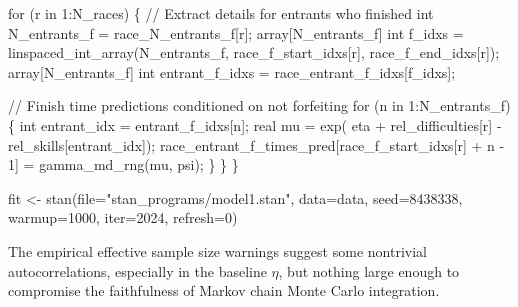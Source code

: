 \documentclass[
  letterpaper,
  DIV=11,
  numbers=noendperiod]{scrartcl}
\newenvironment{Shaded}{\begin{snugshade}}{\end{snugshade}}
\newcommand{\AttributeTok}[1]{\textcolor[rgb]{0.40,0.45,0.13}{#1}}
\newcommand{\CommentTok}[1]{\textcolor[rgb]{0.37,0.37,0.37}{#1}}
\newcommand{\ControlFlowTok}[1]{\textcolor[rgb]{0.00,0.23,0.31}{#1}}
\newcommand{\DataTypeTok}[1]{\textcolor[rgb]{0.68,0.00,0.00}{#1}}
\newcommand{\DecValTok}[1]{\textcolor[rgb]{0.68,0.00,0.00}{#1}}
\newcommand{\FunctionTok}[1]{\textcolor[rgb]{0.28,0.35,0.67}{#1}}
\newcommand{\NormalTok}[1]{\textcolor[rgb]{0.00,0.23,0.31}{#1}}
\newcommand{\OtherTok}[1]{\textcolor[rgb]{0.00,0.23,0.31}{#1}}
\newcommand{\SpecialCharTok}[1]{\textcolor[rgb]{0.37,0.37,0.37}{#1}}
\newcommand{\StringTok}[1]{\textcolor[rgb]{0.13,0.47,0.30}{#1}}
\begin{document}
\begin{codelisting}
\begin{Shaded}
\begin{Highlighting}[]
  \ControlFlowTok{for}\NormalTok{ (r }\ControlFlowTok{in} \DecValTok{1}\NormalTok{:N\_races) \{}
    \CommentTok{// Extract details for entrants who finished}
    \DataTypeTok{int}\NormalTok{ N\_entrants\_f = race\_N\_entrants\_f[r];}
    \DataTypeTok{array}\NormalTok{[N\_entrants\_f] }\DataTypeTok{int}\NormalTok{ f\_idxs}
\NormalTok{      = linspaced\_int\_array(N\_entrants\_f,}
\NormalTok{                            race\_f\_start\_idxs[r],}
\NormalTok{                            race\_f\_end\_idxs[r]);}
    \DataTypeTok{array}\NormalTok{[N\_entrants\_f] }\DataTypeTok{int}\NormalTok{ entrant\_f\_idxs}
\NormalTok{      = race\_entrant\_f\_idxs[f\_idxs];}

    \CommentTok{// Finish time predictions conditioned on not forfeiting}
    \ControlFlowTok{for}\NormalTok{ (n }\ControlFlowTok{in} \DecValTok{1}\NormalTok{:N\_entrants\_f) \{}
      \DataTypeTok{int}\NormalTok{ entrant\_idx = entrant\_f\_idxs[n];}
      \DataTypeTok{real}\NormalTok{ mu = exp(  eta}
\NormalTok{                    + rel\_difficulties[r]}
\NormalTok{                    {-} rel\_skills[entrant\_idx]);}
\NormalTok{      race\_entrant\_f\_times\_pred[race\_f\_start\_idxs[r] + n {-} }\DecValTok{1}\NormalTok{]}
\NormalTok{        = gamma\_md\_rng(mu, psi);}
\NormalTok{    \}}
\NormalTok{  \}}
\NormalTok{\}}
\end{Highlighting}
\end{Shaded}

\end{codelisting}

\begin{Shaded}
\begin{Highlighting}[]
\NormalTok{fit }\OtherTok{\textless{}{-}} \FunctionTok{stan}\NormalTok{(}\AttributeTok{file=}\StringTok{"stan\_programs/model1.stan"}\NormalTok{,}
            \AttributeTok{data=}\NormalTok{data, }\AttributeTok{seed=}\DecValTok{8438338}\NormalTok{,}
            \AttributeTok{warmup=}\DecValTok{1000}\NormalTok{, }\AttributeTok{iter=}\DecValTok{2024}\NormalTok{, }\AttributeTok{refresh=}\DecValTok{0}\NormalTok{)}
\end{Highlighting}
\end{Shaded}

The empirical effective sample size warnings suggest some nontrivial
autocorrelations, especially in the baseline \(\eta\), but nothing large
enough to compromise the faithfulness of Markov chain Monte Carlo
integration.

\begin{Shaded}
\end{Shaded}
\end{document}
